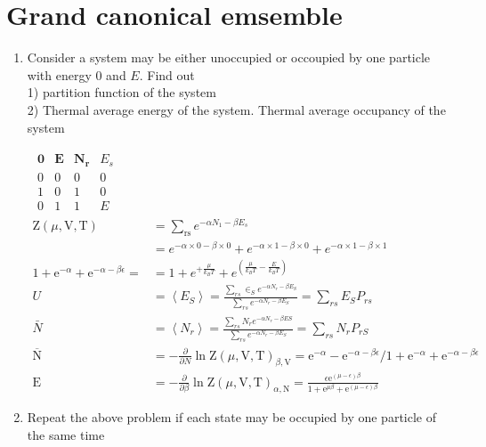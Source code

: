 \section{Grand canonical emsemble}
\begin{enumerate}
	\item Consider a system may be either unoccupied or occoupied by one particle with energy $0$ and $E$. Find out \\
	1) partition function of the system \\
	2) Thermal average energy of the system. Thermal average occupancy of the system
	\begin{answer}
		\begin{align*}
			\begin{array}{llll}\mathbf{0} & \mathbf{E} & \mathbf{N_{r}} &E_s\\ 0 & 0 & 0 &0\\ 1 & 0 & 1 &0\\ 0 & 1 & 1&E\end{array}\\
			\mathrm{Z}(\mu, \mathrm{V}, \mathrm{T})&=\sum_{\mathrm{rs}}e^{-\alpha N_1-\beta E_s}\\
			&=e^{-\alpha\times0-\beta\times0}+e^{-\alpha\times1-\beta\times0}+e^{-\alpha\times1-\beta\times1}\\
			1+\mathrm{e}^{-\alpha}+\mathrm{e}^{-\alpha-\beta \epsilon}=&=1+e^{+\frac{\mu}{k_{B} T}}+e^{\left(\frac{\mu}{k_{B} T}-\frac{E}{k_{B} T}\right)}\\
			U&=\left\langle E_{S}\right\rangle=\frac{\sum_{r s} \in_{S} e^{-\alpha N_{r}-\beta E_{S}}}{\sum_{r s} e^{-\alpha N_{r}-\beta E_{S}}}=\sum_{r s} E_{S} P_{r s}\\
			\bar{N}&=\left\langle N_{r}\right\rangle=\frac{\sum_{r s} N_{r} e^{-\alpha N_{r}-\beta E S}}{\sum_{r s} e^{-\alpha N_{r}-\beta E_{S}}}=\sum_{r s} N_{r} P_{r S}\\
			\overline{\mathrm{N}}&=-\frac{\partial}{\partial N} \ln \mathrm{Z}(\mu, \mathrm{V}, \mathrm{T})_{\beta, \mathrm{V}}=\mathrm{e}^{-\alpha}-\mathrm{e}^{-\alpha-\beta \epsilon} / 1+\mathrm{e}^{-\alpha}+\mathrm{e}^{-\alpha-\beta \epsilon}\\
			\mathrm{E}&=-\frac{\partial}{\partial \beta} \ln \mathrm{Z}(\mu, \mathrm{V}, \mathrm{T})_{\alpha, \mathrm{N}}=\frac{\epsilon \mathrm{e}^{(\mu-\epsilon) \beta}}{1+\mathrm{e}^{\mu \beta}+\mathrm{e}^{(\mu-\epsilon) \beta}}
		\end{align*}
	\end{answer}
 \item Repeat the above problem if each state may be occupied by one particle of the same time 

\end{enumerate}
